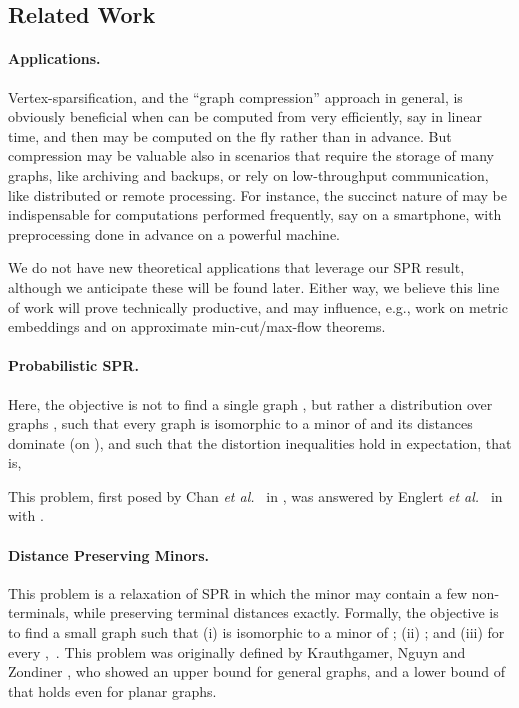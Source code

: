 \documentclass[twoside,leqno,twocolumn]{article}
\newcommand{\etal}{{\em et al.\ }\xspace}
\begin{document}
\subsection{Related Work} \label{sec:related}

\paragraph{Applications.}
Vertex-sparsification, and the ``graph compression'' approach in general, 
is obviously beneficial when  can be computed from  very efficiently, 
say in linear time, 
and then  may be computed on the fly rather than in advance.
But compression may be valuable also in scenarios
that require the storage of many graphs, like archiving and backups,
or rely on low-throughput communication, like distributed or remote processing.
For instance, the succinct nature of  may be indispensable for computations
performed frequently, say on a smartphone,
with preprocessing done in advance on a powerful machine.

We do not have new theoretical applications that leverage our SPR result,
although we anticipate these will be found later. 
Either way, we believe this line of work will prove technically productive,
and may influence, e.g., work on metric embeddings 
and on approximate min-cut/max-flow theorems.

\paragraph{Probabilistic SPR.}
Here, the objective is not to find a single graph ,
but rather a distribution  over graphs ,
such that every graph  is isomorphic to a minor of 
and its distances  dominate  (on ),
and such that the distortion inequalities hold in expectation, that is,

This problem, first posed by Chan \etal in \cite{CXKR06}, was answered by Englert \etal in \cite{EGKRTT10}
with .

\paragraph{Distance Preserving Minors.} 
This problem is a relaxation of SPR in which the minor  may contain a few non-terminals,
while preserving terminal distances exactly.
Formally, the objective is to find a small graph  such that
(i)  is isomorphic to a minor of ;
(ii) ; and
(iii) for every ,\ .
This problem was originally defined by Krauthgamer, Nguyn and Zondiner \cite{KNZ14},
who showed an upper bound  for general graphs,
and a lower bound of  that holds even for planar graphs. 
\end{document}
